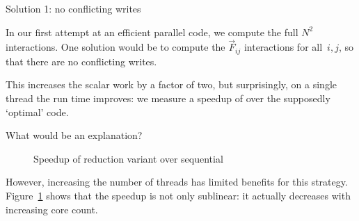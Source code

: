  {Solution 1: no conflicting writes}

In our first attempt at an efficient parallel code,
we compute the full $N^2$ interactions.
One solution would be to compute the $\overrightarrow F_{ij}$
interactions for all~$i,j$,
so that there are no conflicting writes.


This increases the scalar work by a factor of two,
but surprisingly, on a single thread the run time improves:
we measure a speedup of  over the supposedly `optimal' code.

\begin{exercise}
  What would be an explanation?
\end{exercise}

\begin{figure}[t]
  \caption{{Speedup of reduction variant over sequential}}
  \label{fig:omp-nbody1}
\end{figure}

However, increasing the number of threads has limited benefits for this strategy.
Figure~\ref{fig:omp-nbody1} shows that
the speedup is not only sublinear:
it actually decreases with increasing core count.

\begin{comment}
\begin{verbatim}
================ #threads = 1 ================
               Sequential: 2.029093e+01; 
       Full loop Parallel: 3.118345e+00; speedup= 6.51
================ #threads = 18 ================
       Full loop Parallel: 1.940827e+00; speedup=10.46
================ #threads = 37 ================
       Full loop Parallel: 4.390490e+00; speedup= 4.63
================ #threads = 56 ================
       Full loop Parallel: 8.484191e+00; speedup= 2.40
\end{verbatim}
\end{comment}

